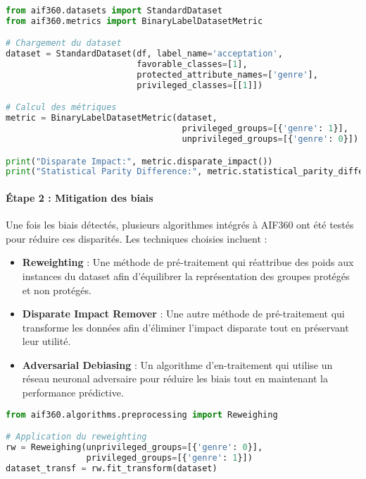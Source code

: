 \documentclass{article}
\begin{document}
\begin{lstlisting}[language=Python, caption=Exemple de code pour la détection des biais]
from aif360.datasets import StandardDataset
from aif360.metrics import BinaryLabelDatasetMetric

# Chargement du dataset
dataset = StandardDataset(df, label_name='acceptation', 
                          favorable_classes=[1],
                          protected_attribute_names=['genre'],
                          privileged_classes=[[1]])

# Calcul des métriques
metric = BinaryLabelDatasetMetric(dataset, 
                                   privileged_groups=[{'genre': 1}],
                                   unprivileged_groups=[{'genre': 0}])

print("Disparate Impact:", metric.disparate_impact())
print("Statistical Parity Difference:", metric.statistical_parity_difference())
\end{lstlisting}

\paragraph*{Étape 2 : Mitigation des biais}

Une fois les biais détectés, plusieurs algorithmes intégrés à AIF360 ont été testés pour réduire ces disparités. Les techniques choisies incluent :

\begin{itemize}
    \item \textbf{Reweighting} : Une méthode de pré-traitement qui réattribue des poids aux instances du dataset afin d'équilibrer la représentation des groupes protégés et non protégés.
    \item \textbf{Disparate Impact Remover} : Une autre méthode de pré-traitement qui transforme les données afin d'éliminer l'impact disparate tout en préservant leur utilité.
    \item \textbf{Adversarial Debiasing} : Un algorithme d'en-traitement qui utilise un réseau neuronal adversaire pour réduire les biais tout en maintenant la performance prédictive.
\end{itemize}

\begin{lstlisting}[language=Python, caption=Exemple de code pour la mitigation des biais]
from aif360.algorithms.preprocessing import Reweighing

# Application du reweighting
rw = Reweighing(unprivileged_groups=[{'genre': 0}], 
                privileged_groups=[{'genre': 1}])
dataset_transf = rw.fit_transform(dataset)
\end{lstlisting}
\end{document}

